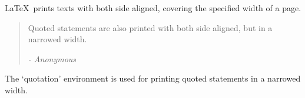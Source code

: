 \documentclass[11pt,a4paper]{article}
\begin{document}
    \LaTeX\ prints texts with both side aligned,
    covering the specified width of a page.
    \begin{quotation}
        \begin{spacing}{1.2}
            Quoted statements are also printed with both side
            aligned, but in a narrowed width.
            \begin{flushright}
                {\it - Anonymous}
            \end{flushright}
        \end{spacing}
    \end{quotation}
    The ‘quotation’ environment is used for printing
    quoted statements in a narrowed width.
\end{document}
